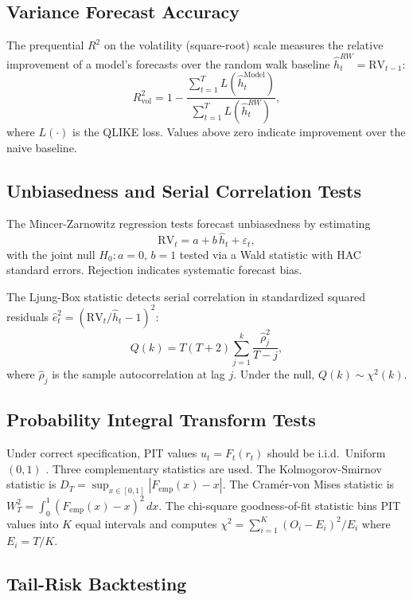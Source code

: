 

\subsection{Variance Forecast Accuracy}

The prequential $R^2$ on the volatility (square-root) scale measures the relative improvement
of a model's forecasts over the random walk baseline $\hat{h}^{RW}_t = \mathrm{RV}_{t-1}$:
\[
    R^2_{\mathrm{vol}} = 1 - \frac{\sum_{t=1}^T L(\hat{h}^{\mathrm{Model}}_t)}{\sum_{t=1}^T L(\hat{h}^{RW}_t)},
\]
where $L(\cdot)$ is the QLIKE loss. Values above zero indicate improvement over the naive
baseline.

\subsection{Unbiasedness and Serial Correlation Tests}

The Mincer-Zarnowitz regression tests forecast unbiasedness by estimating
\[
    \mathrm{RV}_t = a + b\,\hat{h}_t + \varepsilon_t,
\]
with the joint null $H_0: a=0,\,b=1$ tested via a Wald statistic with HAC standard errors.
Rejection indicates systematic forecast bias.

The Ljung-Box statistic detects serial correlation in standardized squared residuals
$\hat{e}_t^2 = (\mathrm{RV}_t / \hat{h}_t - 1)^2$:
\[
    Q(k) = T(T+2)\sum_{j=1}^k \frac{\hat{\rho}_j^2}{T-j},
\]
where $\hat{\rho}_j$ is the sample autocorrelation at lag $j$. Under the null, $Q(k) \sim \chi^2(k)$.

\subsection{Probability Integral Transform Tests}

Under correct specification, PIT values $u_t = F_t(r_t)$ should be i.i.d.\ Uniform$(0,1)$
\citep{diebold1998evaluating}. Three complementary statistics are used. The
Kolmogorov-Smirnov statistic is $D_T = \sup_{x \in [0,1]} |F_{\mathrm{emp}}(x) - x|$. The
Cram\'{e}r-von Mises statistic is $W^2_T = \int_0^1 (F_{\mathrm{emp}}(x) - x)^2\,dx$. The
chi-square goodness-of-fit statistic bins PIT values into $K$ equal intervals and computes
$\chi^2 = \sum_{i=1}^K (O_i - E_i)^2 / E_i$ where $E_i = T/K$.

\subsection{Tail-Risk Backtesting}

